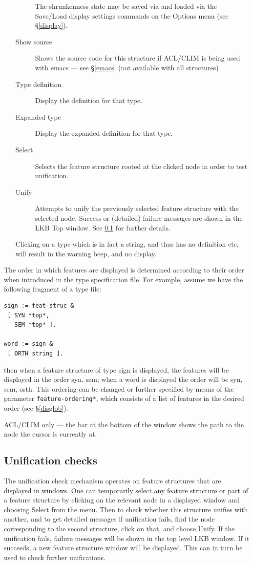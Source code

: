 \documentclass[12pt]{report}
\newcommand{\lkbparam}[1]{{\tt #1}}
\newcommand{\lkbmenucommand}{{\bf}}
\begin{document}
\begin{enumerate}
\begin{description}
The shrunkenness state may be saved via and loaded via the
{\lkbmenucommand Save/Load display settings} commands on the {\lkbmenucommand Options} menu
(see \S\ref{display}).
\item [Show source] Shows the source code for this structure 
if ACL/CLIM is being used with emacs --- see \S\ref{emacs} (not available
with all structures)
\item[Type definition] 
Display the definition for that type.
\item[Expanded type]
Display the expanded definition for that type.
\item[Select]  Selects the
feature structure rooted at the clicked node in order to test unification.
\item[Unify] Attempts to unify the previously selected feature structure
with the selected node.  Success or (detailed) failure messages
are shown in the LKB Top window.  See \ref{unifcheck} for further
details.
\end{description}
Clicking on a type which is in fact a string, and thus has no
definition etc, will result in the warning beep, and no display.
\end{enumerate}

The order in which features are displayed is determined according to
their order when introduced in the type specification file.  For
example, assume we have the following fragment of a type file:
\begin{verbatim}
sign := feat-struc &
 [ SYN *top*, 
   SEM *top* ].

word := sign &
 [ ORTH string ].
\end{verbatim}
then when a feature structure of type {\type sign} is displayed, the
features will be displayed in the order {\feature syn}, {\feature sem}; when a {\type
word} is displayed the order will be {\feature syn}, {\feature sem}, {\feature orth}.
This ordering can be changed or further specified by
means of the parameter \lkbparam{*feature-ordering*}, which consists of
a list of features in the desired order (see \S\ref{disglob}).

ACL/CLIM only --- the bar at the bottom of the window shows the
path to the node the cursor is currently at.

\subsection{Unification checks}
\label{unifcheck}

The unification check mechanism operates on feature
structures that are displayed in windows.  One can
temporarily select any feature structure or part of a feature structure
by clicking on the relevant node in a displayed window and choosing
{\lkbmenucommand Select} from the menu.  Then to check whether this structure
unifies with another, and to get detailed messages if unification fails,
find the node corresponding to the second
structure, click on that, and choose {\lkbmenucommand Unify}.
If the unification fails, failure messages will be shown in the
top level LKB window.  If it succeeds, a new feature structure
window will be displayed.  This can in turn be used to check further
unifications.
\end{document}
